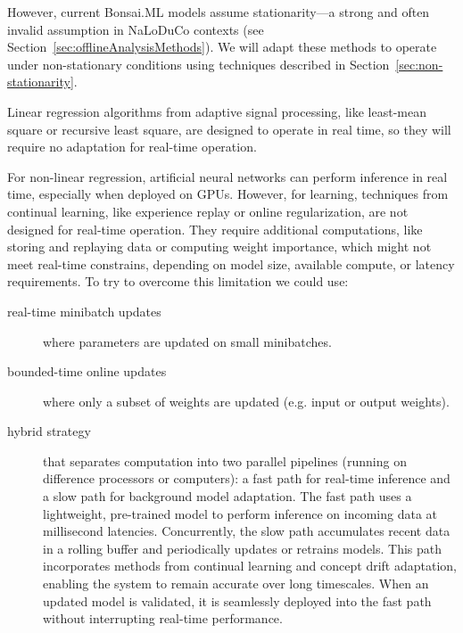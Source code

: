 However, current Bonsai.ML models assume stationarity—a strong and often
invalid assumption in NaLoDuCo contexts (see
Section~\ref{sec:offlineAnalysisMethods}). We will adapt these methods to
operate under non-stationary conditions using techniques described in
Section~\ref{sec:non-stationarity}.

Linear regression algorithms from adaptive signal processing, like
least-mean square or recursive least square, are designed to operate in real
time, so they will require no adaptation for real-time operation.

For non-linear regression, artificial neural networks can perform inference in
real time, especially when deployed on GPUs. However, for learning, techniques from continual
learning, like experience replay  or online regularization, are not designed
for real-time operation. They require additional computations, like storing and
replaying data or computing weight importance, which might not meet real-time
constrains, depending on model size, available compute, or latency
requirements.
%
To try to overcome this limitation we could use:

\begin{description}

    \item[real-time minibatch updates] where parameters are updated on small
        minibatches.

    \item[bounded-time online updates] where only a subset of weights are
        updated (e.g. input or output weights).

    \item[hybrid strategy] that separates computation into two parallel
        pipelines (running on difference processors or computers): a fast path
        for real-time inference and a slow path for background model
        adaptation. The fast path uses a lightweight, pre-trained model to
        perform inference on incoming data at millisecond latencies.
        Concurrently, the slow path accumulates recent data in a rolling buffer
        and periodically updates or retrains models.  This path incorporates
        methods from continual learning and concept drift adaptation, enabling
        the system to remain accurate over long timescales. When an updated
        model is validated, it is seamlessly deployed into the fast path
        without interrupting real-time performance.

\end{description}

